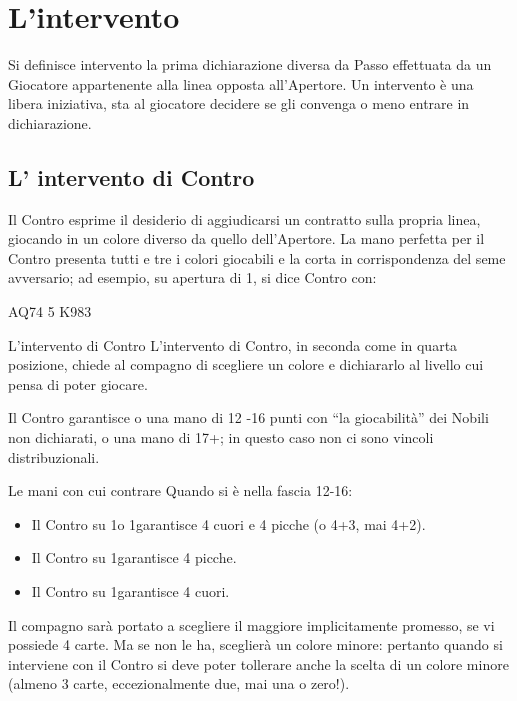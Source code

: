 \documentclass[../corsofiori.tex]{subfiles}
\begin{document}
\chapter{L’intervento}
Si definisce intervento la prima dichiarazione diversa da Passo effettuata da un
Giocatore appartenente alla linea opposta all’Apertore. Un intervento è una libera
iniziativa, sta al giocatore decidere se gli convenga o meno entrare in dichiarazione.

\section{L’ intervento di Contro}

Il Contro esprime il desiderio di aggiudicarsi un contratto sulla propria linea,
giocando in un colore diverso da quello dell’Apertore. La mano perfetta per il Contro
presenta tutti e tre i colori giocabili e la corta in corrispondenza del seme avversario;
ad esempio, su apertura di 1\Di, si dice Contro con:

\smallskip
{} {AQ74} {5} {K983}
\smallskip

\begin{regola}{L'intervento di Contro}
L’intervento di Contro, in seconda come in quarta posizione,
chiede al compagno di scegliere un colore
e dichiararlo al livello cui pensa di poter giocare.
\end{regola}

Il Contro garantisce o una mano di 12 -16 punti con “la giocabilità” dei Nobili non
dichiarati, o una mano di 17+; in questo caso non ci sono vincoli distribuzionali.

\begin{regola}{Le mani con cui contrare}
Quando si è nella fascia 12-16:
\begin{itemize}
\item Il Contro su 1\Cl o 1\Di garantisce 4 cuori e 4 picche (o 4+3, mai 4+2).
\item Il Contro su 1\He garantisce 4 picche.
\item Il Contro su 1\Sp garantisce 4 cuori.
\end{itemize}
\end{regola}

Il compagno sarà portato a scegliere il maggiore implicitamente promesso, se vi
possiede 4 carte. Ma se non le ha, sceglierà un colore minore: pertanto quando si
interviene con il Contro si deve poter tollerare anche la scelta di un colore minore
(almeno 3 carte, eccezionalmente due, mai una o zero!).
\end{document}
